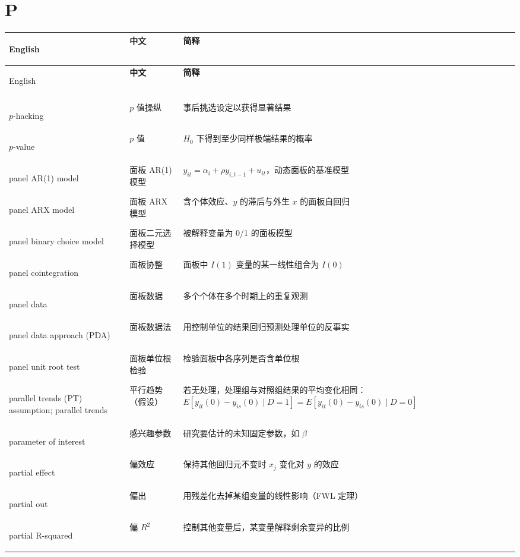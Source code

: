 \par{}\ifdim\dimexpr\pagegoal-\pagetotal\relax<16\baselineskip\newpage\fi
\section*{P}
\begin{longtable}{@{}>{\bfseries\boldmath\raggedright\arraybackslash}p{4.6cm}>{\raggedright\arraybackslash}p{3.2cm}>{\raggedright\arraybackslash}p{\dimexpr\textwidth-7.8cm-4\tabcolsep\relax}@{}}
\toprule
English & \textbf{中文} & \textbf{简释}\\
\midrule
\endfirsthead
\toprule
English & \textbf{中文} & \textbf{简释}\\
\midrule
\endhead
\midrule
\multicolumn{3}{r@{}}{\footnotesize\itshape （续下页）}\\
\endfoot
\bottomrule
\endlastfoot
$p$-hacking & $p$ 值操纵 & 事后挑选设定以获得显著结果 \\
$p$-value & $p$ 值 & $H_0$ 下得到至少同样极端结果的概率 \\
panel AR(1) model & 面板 AR(1) 模型 & $y_{it}=\alpha_i+\rho y_{i,t-1}+u_{it}$，动态面板的基准模型 \\
panel ARX model & 面板 ARX 模型 & 含个体效应、$y$ 的滞后与外生 $x$ 的面板自回归 \\
panel binary choice model & 面板二元选择模型 & 被解释变量为 0/1 的面板模型 \\
panel cointegration & 面板协整 & 面板中 $I(1)$ 变量的某一线性组合为 $I(0)$ \\
panel data & 面板数据 & 多个个体在多个时期上的重复观测 \\
panel data approach (PDA) & 面板数据法 & 用控制单位的结果回归预测处理单位的反事实 \\
panel unit root test & 面板单位根检验 & 检验面板中各序列是否含单位根 \\
parallel trends (PT) assumption; parallel trends & 平行趋势（假设） & 若无处理，处理组与对照组结果的平均变化相同：$E[y_{it}(0)-y_{is}(0)\mid D=1]=E[y_{it}(0)-y_{is}(0)\mid D=0]$ \\
parameter of interest & 感兴趣参数 & 研究要估计的未知固定参数，如 $\beta$ \\
partial effect & 偏效应 & 保持其他回归元不变时 $x_j$ 变化对 $y$ 的效应 \\
partial out & 偏出 & 用残差化去掉某组变量的线性影响（FWL 定理） \\
partial R-squared & 偏 $R^2$ & 控制其他变量后，某变量解释剩余变异的比例 \\

\end{longtable}
